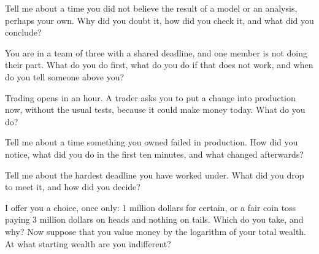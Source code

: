 \begin{question}\label{iq:iv2:behavioural-and-fit:19}
Tell me about a time you did not believe the result of a model or an analysis, perhaps your own. Why did you doubt it, how did you check it, and what did you conclude?
\end{question}

\begin{question}\label{iq:iv2:behavioural-and-fit:20}
You are in a team of three with a shared deadline, and one member is not doing their part. What do you do first, what do you do if that does not work, and when do you tell someone above you?
\end{question}

\begin{question}\label{iq:iv2:behavioural-and-fit:21}
Trading opens in an hour. A trader asks you to put a change into production now, without the usual tests, because it could make money today. What do you do?
\end{question}

\begin{question}\label{iq:iv2:behavioural-and-fit:22}
Tell me about a time something you owned failed in production. How did you notice, what did you do in the first ten minutes, and what changed afterwards?
\end{question}

\begin{question}\label{iq:iv2:behavioural-and-fit:23}
Tell me about the hardest deadline you have worked under. What did you drop to meet it, and how did you decide?
\end{question}

\begin{question}\label{iq:iv2:behavioural-and-fit:24}
I offer you a choice, once only: 1 million dollars for certain, or a fair coin toss paying 3 million dollars on heads and nothing on tails. Which do you take, and why? Now suppose that you value money by the logarithm of your total wealth. At what starting wealth are you indifferent?
\end{question}


